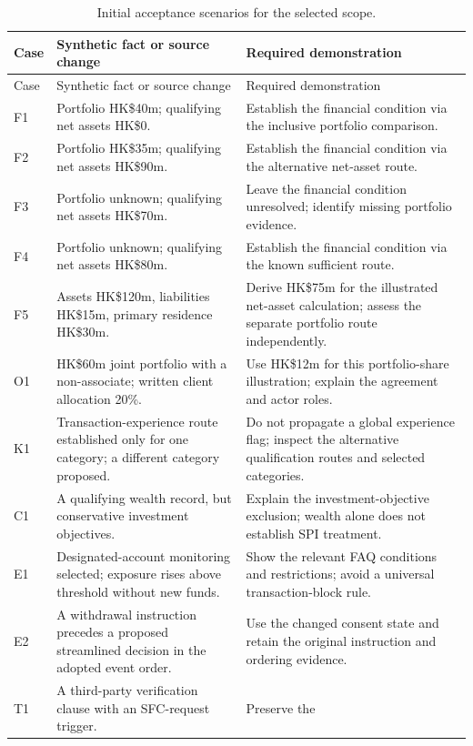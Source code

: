 \documentclass[12pt,a4paper,oneside,openany]{book}
\begin{document}
\begingroup\small
\begin{longtable}{P{0.09\textwidth}P{0.41\textwidth}P{0.4\textwidth}}
\caption{Initial acceptance scenarios for the selected scope.}
\label{tab:cases}\\
\toprule Case & Synthetic fact or source change & Required demonstration \\\midrule
\endfirsthead
\toprule Case & Synthetic fact or source change & Required demonstration \\\midrule
\endhead
F1 & Portfolio HK\$40m; qualifying net assets HK\$0. & Establish the financial
condition via the inclusive portfolio comparison.\\
F2 & Portfolio HK\$35m; qualifying net assets HK\$90m. & Establish the financial
condition via the alternative net-asset route.\\
F3 & Portfolio unknown; qualifying net assets HK\$70m. & Leave the financial
condition unresolved; identify missing portfolio evidence.\\
F4 & Portfolio unknown; qualifying net assets HK\$80m. & Establish the financial
condition via the known sufficient route.\\
F5 & Assets HK\$120m, liabilities HK\$15m, primary residence HK\$30m. & Derive
HK\$75m for the illustrated net-asset calculation; assess the separate portfolio
route independently.\\
O1 & HK\$60m joint portfolio with a non-associate; written client allocation 20\%. &
Use HK\$12m for this portfolio-share illustration; explain the agreement and actor roles.\\
K1 & Transaction-experience route established only for one category; a different
category proposed. & Do not propagate a global experience flag; inspect the
alternative qualification routes and selected categories.\\
C1 & A qualifying wealth record, but conservative investment objectives. & Explain
the investment-objective exclusion; wealth alone does not establish SPI treatment.\\
E1 & Designated-account monitoring selected; exposure rises above threshold without
new funds. & Show the relevant FAQ conditions and restrictions; avoid a universal
transaction-block rule.\\
E2 & A withdrawal instruction precedes a proposed streamlined decision in the
adopted event order. & Use the changed consent state and retain the original
instruction and ordering evidence.\\
T1 & A third-party verification clause with an SFC-request trigger. & Preserve the

\end{longtable}
\end{document}
